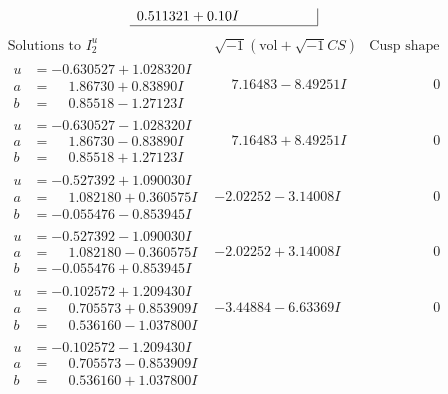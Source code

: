 \documentclass[1p]{elsarticle_modified}
\theoremstyle{definition}
\newcommand{\I}{\sqrt{-1}}
\begin{document}
$$\begin{array}{c|c|c}
0.511321 + 0. 10   I\phantom{ +0.000000I}\\
 \hline 
 \end{array}$$\newpage$$\begin{array}{c|c|c}  
\text{Solutions to }I^u_{2}& \I (\text{vol} + \sqrt{-1}CS) & \text{Cusp shape}\\
 \hline 
\begin{aligned}
u &= -0.630527 + 1.028320 I \\
a &= \phantom{-}1.86730 + 0.83890 I \\
b &= \phantom{-}0.85518 - 1.27123 I\end{aligned}
 & \phantom{-}7.16483 - 8.49251 I & \phantom{-0.000000 } 0 \\ \hline\begin{aligned}
u &= -0.630527 - 1.028320 I \\
a &= \phantom{-}1.86730 - 0.83890 I \\
b &= \phantom{-}0.85518 + 1.27123 I\end{aligned}
 & \phantom{-}7.16483 + 8.49251 I & \phantom{-0.000000 } 0 \\ \hline\begin{aligned}
u &= -0.527392 + 1.090030 I \\
a &= \phantom{-}1.082180 + 0.360575 I \\
b &= -0.055476 - 0.853945 I\end{aligned}
 & -2.02252 - 3.14008 I & \phantom{-0.000000 } 0 \\ \hline\begin{aligned}
u &= -0.527392 - 1.090030 I \\
a &= \phantom{-}1.082180 - 0.360575 I \\
b &= -0.055476 + 0.853945 I\end{aligned}
 & -2.02252 + 3.14008 I & \phantom{-0.000000 } 0 \\ \hline\begin{aligned}
u &= -0.102572 + 1.209430 I \\
a &= \phantom{-}0.705573 + 0.853909 I \\
b &= \phantom{-}0.536160 - 1.037800 I\end{aligned}
 & -3.44884 - 6.63369 I & \phantom{-0.000000 } 0 \\ \hline\begin{aligned}
u &= -0.102572 - 1.209430 I \\
a &= \phantom{-}0.705573 - 0.853909 I \\
b &= \phantom{-}0.536160 + 1.037800 I\end{aligned}

\end{array}$$
\end{document}
